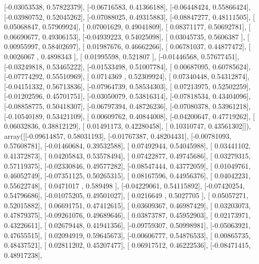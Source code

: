 \documentclass{article}
\begin{document}
       [-0.03053538,  0.57822379],
       [-0.06716583,  0.41366188],
       [-0.06448424,  0.55866424],
       [-0.03980752,  0.52045262],
       [-0.07088025,  0.49315883],
       [-0.08847277,  0.48111505],
       [ 0.05068847,  0.57909924],
       [ 0.07001629,  0.49041809],
       [ 0.08371177,  0.50692781],
       [ 0.06690677,  0.49306153],
       [-0.04939223,  0.54025098],
       [ 0.03045735,  0.5606387 ],
       [ 0.00955997,  0.58402697],
       [ 0.01987676,  0.46662266],
       [ 0.06781037,  0.44877472],
       [ 0.0026067 ,  0.4898343 ],
       [ 0.01995598,  0.521807  ],
       [-0.01446568,  0.57677451],
       [-0.03249818,  0.53465222],
       [-0.01533498,  0.51007784],
       [ 0.00687095,  0.60785624],
       [-0.07774292,  0.55510969],
       [ 0.0714369 ,  0.52309924],
       [ 0.07340448,  0.54312874],
       [-0.04151332,  0.56713836],
       [-0.07964739,  0.58534303],
       [ 0.07213975,  0.52502259],
       [-0.01202596,  0.45701751],
       [-0.03050079,  0.53816314],
       [-0.07818534,  0.43404096],
       [-0.08858775,  0.50418307],
       [-0.06797394,  0.48726236],
       [-0.07080378,  0.53961218],
       [-0.10540189,  0.53421109],
       [ 0.00609762,  0.40844008],
       [-0.04200647,  0.47719262],
       [ 0.06032836,  0.38812129],
       [ 0.01491173,  0.42280458],
       [ 0.10310747,  0.43561302]]), array([[-0.09614857,  0.58031193],
       [-0.01767387,  0.48204431],
       [-0.00781093,  0.57608781],
       [-0.01460684,  0.39532588],
       [ 0.07492944,  0.54045988],
       [ 0.03441102,  0.41372873],
       [ 0.04205843,  0.53578494],
       [ 0.07422877,  0.49745686],
       [ 0.03279315,  0.57119375],
       [-0.02330846,  0.49577282],
       [-0.08547444,  0.43772059],
       [ 0.01049761,  0.46052749],
       [-0.07351125,  0.50265315],
       [ 0.08167596,  0.44956376],
       [ 0.04042231,  0.55622748],
       [ 0.0471017 ,  0.589498  ],
       [-0.04229061,  0.54115892],
       [-0.07420254,  0.54796686],
       [-0.01075205,  0.49501027],
       [ 0.0216649 ,  0.5027705 ],
       [ 0.05057271,  0.52015882],
       [ 0.06691751,  0.47412615],
       [ 0.03609367,  0.46987429],
       [ 0.03203073,  0.47879375],
       [-0.09261076,  0.49689646],
       [ 0.03873787,  0.45952903],
       [ 0.02173971,  0.43226611],
       [ 0.02679448,  0.41941356],
       [-0.09759307,  0.50998981],
       [-0.05063921,  0.47655515],
       [ 0.02094919,  0.59645673],
       [-0.00606777,  0.54876533],
       [ 0.00865735,  0.48437521],
       [ 0.02811202,  0.45207477],
       [ 0.06917512,  0.46222536],
       [-0.08471415,  0.48917238],
\end{document}
